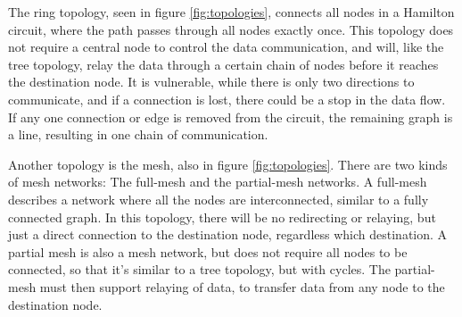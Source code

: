 The ring topology, seen in figure \ref{fig:topologies}, connects all nodes in a Hamilton circuit, where the path passes through all nodes exactly once. This topology does not require a central node to control the data communication, and will, like the tree topology, relay the data through a certain chain of nodes before it reaches the destination node. It is vulnerable, while there is only two directions to communicate, and if a connection is lost, there could be a stop  in the data flow. If any one connection or edge is removed from the circuit, the remaining graph is a line, resulting in one chain of communication.

Another topology is the mesh, also in figure \ref{fig:topologies}. There are two kinds of mesh networks: The full-mesh and the partial-mesh networks. A full-mesh describes a network where all the nodes are interconnected, similar to a fully connected graph. In this topology, there will be no redirecting or relaying, but just a direct connection to the destination node, regardless which destination. A partial mesh is also a mesh network, but does not require all nodes to be connected, so that it's similar to a tree topology, but with cycles. The partial-mesh must then support relaying of data, to transfer data from any node to the destination node.

